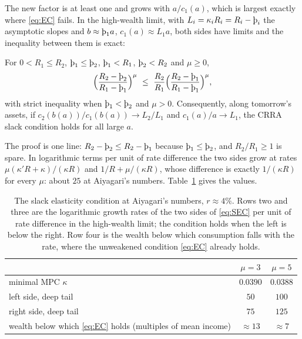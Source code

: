 The new factor is at least one and grows with $a/c_1(a)$, which is largest exactly where
\eqref{eq:EC} fails. In the high-wealth limit, with $L_i=\kappa_iR_i=R_i-\Thorn_i$ the asymptotic
slopes and $b\approx\Thorn_1a$, $c_1(a)\approx L_1a$, both sides have limits and the inequality
between them is exact:

\begin{proposition}
\label{prop:homog}
For $0<R_1\le R_2$, $\Thorn_1\le\Thorn_2$, $\Thorn_1<R_1$, $\Thorn_2<R_2$ and $\mu\ge0$,
\[
  \Bigl(\frac{R_2-\Thorn_2}{R_1-\Thorn_1}\Bigr)^{\mu}\ \le\
  \frac{R_2}{R_1}\Bigl(\frac{R_2-\Thorn_1}{R_1-\Thorn_1}\Bigr)^{\mu},
\]
with strict inequality when $\Thorn_1<\Thorn_2$ and $\mu>0$. Consequently, along tomorrow's
assets, if $c_2(b(a))/c_1(b(a))\to L_2/L_1$ and $c_1(a)/a\to L_1$, the CRRA slack condition holds
for all large $a$.
\end{proposition}

The proof is one line: $R_2-\Thorn_2\le R_2-\Thorn_1$ because $\Thorn_1\le\Thorn_2$, and
$R_2/R_1\ge1$ is spare. In logarithmic terms per unit of rate difference the two sides grow at
rates $\mu(\kappa'R+\kappa)/(\kappa R)$ and $1/R+\mu/(\kappa R)$, whose difference is exactly
$1/(\kappa R)$ for every $\mu$: about $25$ at Aiyagari's numbers. Table~\ref{tab:slack} gives the
values.

\begin{table}[t]
\centering
\caption{The slack elasticity condition at Aiyagari's numbers, $r\approx4\%$. Rows two and three
are the logarithmic growth rates of the two sides of \eqref{eq:SEC} per unit of rate difference in
the high-wealth limit; the condition holds when the left is below the right. Row four is the wealth
below which consumption falls with the rate, where the unweakened condition \eqref{eq:EC} already
holds.}
\label{tab:slack}
\begin{tabular}{lcc}
\toprule
 & $\mu=3$ & $\mu=5$\\
\midrule
minimal MPC $\kappa$ & $0.0390$ & $0.0388$\\
left side, deep tail & $50$ & $100$\\
right side, deep tail & $75$ & $125$\\
wealth below which \eqref{eq:EC} holds (multiples of mean income) & $\approx13$ & $\approx7$\\
\bottomrule
\end{tabular}
\end{table}

